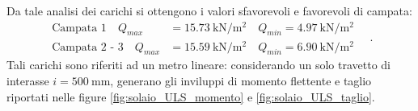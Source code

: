 Da tale analisi dei carichi si ottengono i valori sfavorevoli e favorevoli di campata:
\begin{equation}
	\begin{split}
	\text{Campata 1} \quad Q_{max} &= \SI{15.73}{\kilo\newton\per\metre\squared} \quad Q_{min} = \SI{4.97}{\kilo\newton\per\metre\squared} \\
	\text{Campata 2 - 3} \quad Q_{max} &= \SI{15.59}{\kilo\newton\per\metre\squared} \quad Q_{min} = \SI{6.90}{\kilo\newton\per\metre\squared}
	\end{split}\quad .
\end{equation}
Tali carichi sono riferiti ad un metro lineare: considerando un solo travetto di interasse $i = \SI{500}{\milli\metre}$, generano gli inviluppi di momento flettente e taglio riportati nelle figure \ref{fig:solaio_ULS_momento} e \ref{fig:solaio_ULS_taglio}.


